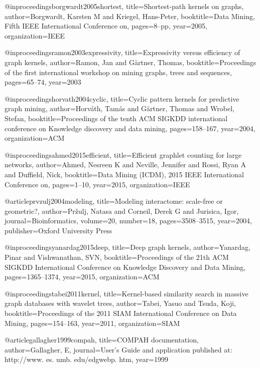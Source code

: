 @inproceedings{borgwardt2005shortest,
  title={Shortest-path kernels on graphs},
  author={Borgwardt, Karsten M and Kriegel, Hans-Peter},
  booktitle={Data Mining, Fifth IEEE International Conference on},
  pages={8--pp},
  year={2005},
  organization={IEEE}
}

@inproceedings{ramon2003expressivity,
  title={Expressivity versus efficiency of graph kernels},
  author={Ramon, Jan and G{\"a}rtner, Thomas},
  booktitle={Proceedings of the first international workshop on mining graphs, trees and sequences},
  pages={65--74},
  year={2003}
}

@inproceedings{horvath2004cyclic,
  title={Cyclic pattern kernels for predictive graph mining},
  author={Horv{\'a}th, Tam{\'a}s and G{\"a}rtner, Thomas and Wrobel, Stefan},
  booktitle={Proceedings of the tenth ACM SIGKDD international conference on Knowledge discovery and data mining},
  pages={158--167},
  year={2004},
  organization={ACM}
}

@inproceedings{ahmed2015efficient,
  title={Efficient graphlet counting for large networks},
  author={Ahmed, Nesreen K and Neville, Jennifer and Rossi, Ryan A and Duffield, Nick},
  booktitle={Data Mining (ICDM), 2015 IEEE International Conference on},
  pages={1--10},
  year={2015},
  organization={IEEE}
}

@article{prvzulj2004modeling,
  title={Modeling interactome: scale-free or geometric?},
  author={Pr{\v{z}}ulj, Natasa and Corneil, Derek G and Jurisica, Igor},
  journal={Bioinformatics},
  volume={20},
  number={18},
  pages={3508--3515},
  year={2004},
  publisher={Oxford University Press}
}

@inproceedings{yanardag2015deep,
  title={Deep graph kernels},
  author={Yanardag, Pinar and Vishwanathan, SVN},
  booktitle={Proceedings of the 21th ACM SIGKDD International Conference on Knowledge Discovery and Data Mining},
  pages={1365--1374},
  year={2015},
  organization={ACM}
}

@inproceedings{tabei2011kernel,
  title={Kernel-based similarity search in massive graph databases with wavelet trees},
  author={Tabei, Yasuo and Tsuda, Koji},
  booktitle={Proceedings of the 2011 SIAM International Conference on Data Mining},
  pages={154--163},
  year={2011},
  organization={SIAM}
}

@article{gallagher1999compah,
  title={COMPAH documentation},
  author={Gallagher, E},
  journal={User’s Guide and application published at: http://www. es. umb. edu/edgwebp. htm},
  year={1999}
}

